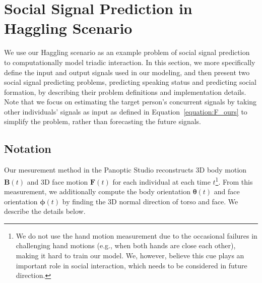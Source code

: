 
\section{Social Signal Prediction in Haggling Scenario}
We use our Haggling scenario as an example problem of social signal prediction to computationally model triadic interaction. In this section, we more specifically define the input and output signals used in our modeling, and then present two social signal predicting problems, predicting speaking status and predicting social formation, by describing their problem definitions and implementation details. Note that we focus on estimating the target person's concurrent signals by taking other individuals' signals as input as defined in Equation~\ref{equation:F_ours} to simplify the problem, rather than forecasting the future signals.

\subsection{Notation}

Our mesurement method in the Panoptic Studio reconstructs 3D body motion $\mathbf{B}(t)$ and 3D face motion $\mathbf{F}(t)$ for each individual at each time $t$\footnote{We do not use the hand motion measurement due to the occasional failures in challenging hand motions (e.g., when both hands are close each other), making it hard to train our model. We, however, believe this cue plays an important role in social interaction, which needs to be considered in future direction.}. From this measurement, we additionally compute the body orientation $\boldsymbol{\theta}(t)$ and face orientation $\boldsymbol{\phi}(t)$ by finding the 3D normal direction of torso and face. We describe the details below.

